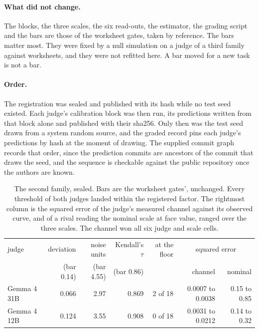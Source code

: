 \documentclass{article}
\theoremstyle{definition}
\theoremstyle{remark}
\begin{document}
\paragraph{What did not change.}
The blocks, the three scales, the six read-outs, the estimator, the grading script and the bars are those of the worksheet gates, taken by reference. The bars matter most. They were fixed by a null simulation on a judge of a third family against worksheets, and they were not refitted here. A bar moved for a new task is not a bar.

\paragraph{Order.}
The registration was sealed and published with its hash while no test seed existed. Each judge's calibration block was then run, its predictions written from that block alone and published with their sha256. Only then was the test seed drawn from a system random source, and the graded record pins each judge's predictions by hash at the moment of drawing. The supplied commit graph records that order, since the prediction commits are ancestors of the commit that draws the seed, and the sequence is checkable against the public repository once the authors are known.

\begin{table}[h]
\centering
\small
\caption{The second family, sealed. Bars are the worksheet gates', unchanged. Every threshold of both judges landed within the registered factor. The rightmost column is the squared error of the judge's measured channel against its observed curve, and of a rival reading the nominal scale at face value, ranged over the three scales. The channel won all six judge and scale cells.}
\label{tab:family}
\begin{tabular}{lrrrrrr}
\toprule
judge & deviation & noise units & Kendall's $\tau$ & at the floor & \multicolumn{2}{c}{squared error} \\
 & (bar 0.14) & (bar 4.55) & (bar 0.86) & & channel & nominal \\
\midrule
Gemma 4 31B & 0.066 & 2.97 & 0.869 & 2 of 18 & 0.0007 to 0.0038 & 0.15 to 0.85 \\
Gemma 4 12B & 0.124 & 3.55 & 0.908 & 0 of 18 & 0.0031 to 0.0212 & 0.14 to 0.32 \\
\bottomrule
\end{tabular}
\end{table}
\end{document}
